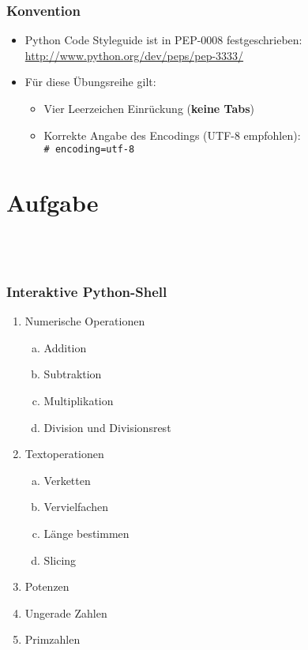     \begin{frame}
        \frametitle{Konvention}
        \begin{itemize}
        \item Python Code Styleguide ist in PEP-0008 festgeschrieben: \\
            \url{http://www.python.org/dev/peps/pep-3333/}
        \item Für diese Übungsreihe gilt:
            \begin{itemize}
            \item Vier Leerzeichen Einrückung (\textbf{keine Tabs})
            \item Korrekte Angabe des Encodings (UTF-8 empfohlen): \\
                \texttt{\# encoding=utf-8}
            \end{itemize}
        \end{itemize}
    \end{frame}

    \section{Aufgabe}\subsection{~}

    \begin{frame}
        \frametitle{Interaktive Python-Shell}
        \begin{enumerate}[1.]
        \item Numerische Operationen
            \begin{enumerate}[a)]
            \item Addition
            \item Subtraktion
            \item Multiplikation
            \item Division und Divisionsrest
            \end{enumerate}
        \item Textoperationen
            \begin{enumerate}[a)]
            \item Verketten
            \item Vervielfachen
            \item Länge bestimmen
            \item Slicing
            \end{enumerate}
        \item Potenzen
        \item Ungerade Zahlen
        \item Primzahlen
        \end{enumerate}
    \end{frame}


